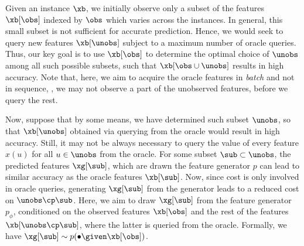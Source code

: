 \documentclass[letterpaper]{article}
\begin{document}
Given an instance $\xb$, we initially observe only a subset of the features $\xb[\obs]$ indexed by  $\obs$ which varies across the instances. In general, this small subset is not sufficient for accurate prediction. Hence, we would seek to query new features $\xb[\unobs]$ subject to a maximum number of oracle queries. Thus, our key goal is to use $\xb[\obs]$ to determine the optimal choice of $\unobs$ among all such possible subsets, such that $\xb[\obs \cup \unobs]$ results in high accuracy. Note that, here, we aim to acquire the oracle features in \emph{batch} and not in sequence, \ie, we may not observe a part of the unobserved features, before we query the rest.

Now, suppose that by some means, we have determined such subset $\unobs$, so that  $\xb[\unobs]$ obtained via querying from the oracle would result in high accuracy.
Still, it may not be always necessary to query the value of every feature $x(u)$ for all $u\in \unobs$ from the oracle. For some subset $\sub \subset \unobs$,  the predicted features $\xg[\sub]$, which are drawn the feature generator $p$ can lead to similar accuracy as the oracle features $\xb[\sub]$. Now, since cost is only involved in oracle queries, generating $\xg[\sub]$ from the generator leads to a reduced cost on $\unobs\cp \sub$.
Here, we aim to draw $\xg[\sub]$ from the feature generator $p_{\phi}$, conditioned on the observed features $\xb[\obs]$ and the rest of the features $\xb[\unobs \cp \sub]$, where the latter is queried from the oracle. Formally, we have
$\xg[\sub] \sim p  (\bullet \given \xb[\obs])$.
\end{document}
